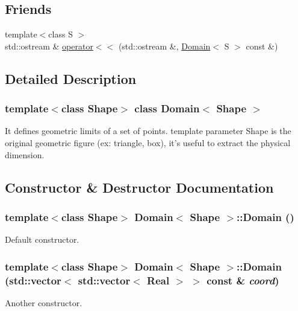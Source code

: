 \subsection*{Friends}
\begin{DoxyCompactItemize}
\item 
{\footnotesize template$<$class S $>$ }\\std::ostream \& \hyperlink{classDomain_ada92a5558513a06e75511c76227bf52c}{operator$<$$<$} (std::ostream \&, \hyperlink{classDomain}{Domain}$<$ S $>$ const \&)
\end{DoxyCompactItemize}


\subsection{Detailed Description}
\subsubsection*{template$<$class Shape$>$ class Domain$<$ Shape $>$}

It defines geometric limits of a set of points. template parameter Shape is the original geometric figure (ex: triangle, box), it's useful to extract the physical dimension. 

\subsection{Constructor \& Destructor Documentation}
\hypertarget{classDomain_a605dd094b6b53616070ae43688abe2a4}{
\subsubsection[{Domain}]{\setlength{\rightskip}{0pt plus 5cm}template$<$class Shape$>$ {\bf Domain}$<$ Shape $>$::{\bf Domain} ()}}
\label{classDomain_a605dd094b6b53616070ae43688abe2a4}
Default constructor. \hypertarget{classDomain_a64da121c550de1bc767ab50bf26280e1}{
\subsubsection[{Domain}]{\setlength{\rightskip}{0pt plus 5cm}template$<$class Shape$>$ {\bf Domain}$<$ Shape $>$::{\bf Domain} (std::vector$<$ std::vector$<$ Real $>$ $>$ const \& {\em coord})}}
\label{classDomain_a64da121c550de1bc767ab50bf26280e1}
Another constructor.


